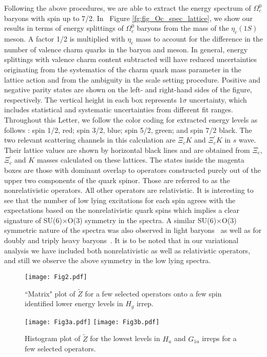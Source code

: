 \documentclass[showkeys,aps,twocolumn,showpacs,preprintnumbers,amsmath,amssymb,prd,letterpaper,floatfix,nofootinbib,superscriptaddress,]{revtex4-1}
\newcommand\bef{\begin{figure}}
\newcommand\eef[1]{\label{fg:#1}\end{figure}}
\newcommand\fgn[1]{Figure \ref{fg:#1}}
\begin{document}
{
Following the above procedures, we are able to extract the energy spectrum of
$\Omega_{c}^{0}$ baryons with spin up to 7/2. In
~\fgn{fig_Oc_spec_lattice}, we show our results in terms of energy
splittings of $\Omega^{0}_{c}$ baryons from the mass of the $\eta_c(1S)$ meson. A
factor 1/2 is multiplied with $\eta_c$ mass to account for the
difference in the number of valence charm quarks in the baryon and meson.
In general, energy splittings with valence charm content subtracted
will have reduced uncertainties originating from the systematics of
the charm quark mass parameter in the lattice action and from the
ambiguity in the scale setting procedure. Positive and negative parity states are shown on the left- and right-hand sides of the figure, respectively.
The vertical height in each box represents $1\sigma$ uncertainty, which includes statistical
and systematic uncertainties from different fit ranges.
Throughout this Letter, we follow the color coding 
for extracted energy levels as follows : spin 1/2, red;
spin 3/2, blue; spin 5/2, green; and spin 7/2 black.  The two relevant scattering channels in this
calculation are $\Xi_cK$ and $\Xi^{\prime}_cK$ in $s$ wave. Their lattice
values are shown by horizontal black lines and are obtained from $\Xi_c$, $\Xi^{\prime}_c$ and $K$ masses calculated on these lattices. 
The states inside the magenta boxes are those with dominant
overlap to operators constructed purely out of the upper two
components of the quark spinor. Those are
referred to as the nonrelativistic operators. All other operators
are relativistic.  
It is interesting to see that the number of low lying excitations for
each spin agrees with the expectations based on the nonrelativistic
quark spins which implies a clear signature of SU(6)$\times$O(3)
symmetry in the spectra.  A similar SU(6)$\times$O(3) symmetric nature
of the spectra was also observed in light baryons~\cite{Edwards:2012fx} as
well as for doubly and triply heavy
baryons~\cite{Padmanath:2015jea,Padmanath:2013zfa}. It is to be noted
that in our variational analysis we have included both
nonrelativistic as well as relativistic operators, and still we
observe the above symmetry in the low lying spectra.

\bef[!t]
\centering
\texttt{[image: Fig2.pdf]}
\vspace*{-0.08in}
\caption{``Matrix" plot of $\tilde{Z}$ for a few selected operators onto a 
few spin identified lower energy levels in $H_g$ irrep.}
\eef{rel_Hg_t013}
\bef[tbh]
\centering
\vspace*{-0.1in}
\texttt{[image: Fig3a.pdf]}
\texttt{[image: Fig3b.pdf]}
\vspace*{-0.08in}
\caption{Histogram plot of $\tilde{Z}$ for the lowest levels in $H_u$ and $G_{1u}$ irreps for a few selected operators.}
\eef{spinhist}

}
\end{document}
